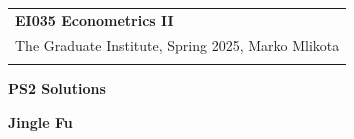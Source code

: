 \documentclass[a4paper,12pt]{article} %
\theoremstyle{nonitalic}
\begin{document}
\thispagestyle{empty} %

\begin{tabular}{p{15.5cm}} %
{\large \bf EI035 Econometrics II} \\
The Graduate Institute, Spring 2025, Marko Mlikota\\
\hline %
\\
\end{tabular} %

\vspace*{0.3cm} %

\begin{center} %
	{\Large \bf PS2 Solutions} %
	\vspace{2mm}
	
	{\bf Jingle Fu} %
		
\end{center}  

\vspace{0.4cm}
\end{document}
